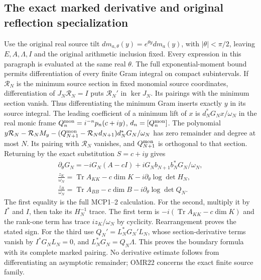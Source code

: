 \documentclass[11pt,a4paper]{article}
\begin{document}
\subsection{The exact marked derivative and original reflection specialization}

Use the original real source tilt $dm_{a,\theta}(y)=e^{\theta y}dm_a(y)$,
with $|\theta|<\pi/2$, leaving $E,A,\Lambda,I$ and the original
arithmetic inclusion fixed. Every expression in this paragraph is
evaluated at the same real $\theta$. The full exponential-moment
bound permits differentiation of every finite Gram integral on
compact subintervals. If $\mathcal R_N$ is the minimum source
section in fixed monomial source coordinates, differentiation of
$J_N\mathcal R_N=I$ puts $\mathcal R_N'$ in $\ker J_N$.
Its pairings with the minimum section vanish. Thus differentiating
the minimum Gram inserts exactly $y$ in its source integral.
The leading coefficient of a minimum lift of $x$ is
$d_N^*G_Nx/\omega_N$ in the real monic frame
$Q_n^{\rm mon}=i^{-n}p_n(c+iy)$, $d_n=[Q_n^{\rm mon}]$.
The polynomial
$y\mathcal R_N-\mathcal R_NM_y
 -(Q_{N+1}^{\rm mon}-\mathcal R_Nd_{N+1})d_N^*G_N/\omega_N$
has zero remainder and degree at most $N$. Its pairing with
$\mathcal R_N$ vanishes, and $Q_{N+1}^{\rm mon}$ is orthogonal to that
section. Returning by the exact substitution $S=c+iy$ gives
\[
 \begin{gathered}
 \partial_\theta G_N
   =-iG_N(A-cI)+iG_Nb_{N+1}b_N^*G_N/\omega_N,\\
 \frac{z_K}{\omega_N}
   =\operatorname{Tr}A_{KK}-c\dim K
               -i\partial_\theta\log\det H_N,\\
 \frac{z_B}{\omega_N}
   =\operatorname{Tr}A_{BB}-c\dim B
               -i\partial_\theta\log\det Q_N.
 \end{gathered}\tag{OMR22}
\]
The first equality is the full MCP1--2 calculation. For the second,
multiply it by $I^*$ and $I$, then take its $H_N^{-1}$ trace.
The first term is $-i(\operatorname{Tr}A_{KK}-c\dim K)$ and
the rank-one term has trace $iz_K/\omega_N$ by cyclicity.
Rearrangement proves the stated sign. For the third use
$Q_N'=L_N^*G_N'L_N$, whose section-derivative terms vanish by
$I^*G_NL_N=0$, and $L_N^*G_N=Q_N\Lambda$.
This proves the boundary formula with its complete marked pairing.
No derivative estimate follows from differentiating an asymptotic
remainder; OMR22 concerns the exact finite source family.
\end{document}
